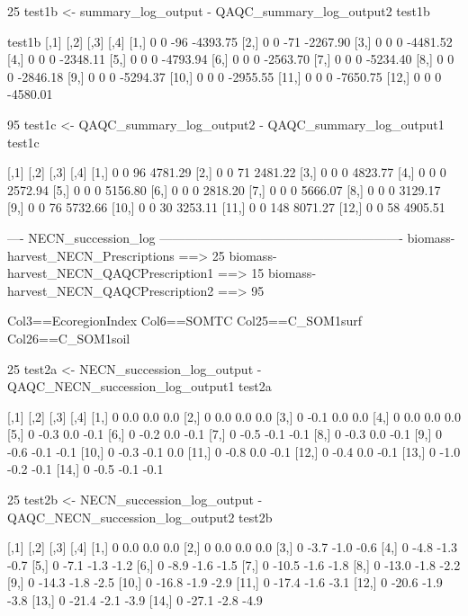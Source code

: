 25%
test1b <- summary_log_output - QAQC_summary_log_output2
test1b

test1b
      [,1] [,2] [,3]     [,4]
 [1,]    0    0  -96 -4393.75
 [2,]    0    0  -71 -2267.90
 [3,]    0    0    0 -4481.52
 [4,]    0    0    0 -2348.11
 [5,]    0    0    0 -4793.94
 [6,]    0    0    0 -2563.70
 [7,]    0    0    0 -5234.40
 [8,]    0    0    0 -2846.18
 [9,]    0    0    0 -5294.37
[10,]    0    0    0 -2955.55
[11,]    0    0    0 -7650.75
[12,]    0    0    0 -4580.01


95%
test1c <- QAQC_summary_log_output2 - QAQC_summary_log_output1
test1c

      [,1] [,2] [,3]    [,4]
 [1,]    0    0   96 4781.29
 [2,]    0    0   71 2481.22
 [3,]    0    0    0 4823.77
 [4,]    0    0    0 2572.94
 [5,]    0    0    0 5156.80
 [6,]    0    0    0 2818.20
 [7,]    0    0    0 5666.07
 [8,]    0    0    0 3129.17
 [9,]    0    0   76 5732.66
[10,]    0    0   30 3253.11
[11,]    0    0  148 8071.27
[12,]    0    0   58 4905.51


---- NECN_succession_log ----------------------------------------------------------
biomass-harvest_NECN_Prescriptions	==> 25%
biomass-harvest_NECN_QAQCPrescription1	==> 15%
biomass-harvest_NECN_QAQCPrescription2	==> 95%

Col3==EcoregionIndex
Col6==SOMTC
Col25==C_SOM1surf
Col26==C_SOM1soil

25%
test2a <- NECN_succession_log_output - QAQC_NECN_succession_log_output1
test2a

      [,1] [,2] [,3] [,4]
 [1,]    0  0.0  0.0  0.0
 [2,]    0  0.0  0.0  0.0
 [3,]    0 -0.1  0.0  0.0
 [4,]    0  0.0  0.0  0.0
 [5,]    0 -0.3  0.0 -0.1
 [6,]    0 -0.2  0.0 -0.1
 [7,]    0 -0.5 -0.1 -0.1
 [8,]    0 -0.3  0.0 -0.1
 [9,]    0 -0.6 -0.1 -0.1
[10,]    0 -0.3 -0.1  0.0
[11,]    0 -0.8  0.0 -0.1
[12,]    0 -0.4  0.0 -0.1
[13,]    0 -1.0 -0.2 -0.1
[14,]    0 -0.5 -0.1 -0.1



25%
test2b <- NECN_succession_log_output - QAQC_NECN_succession_log_output2
test2b

      [,1]  [,2] [,3] [,4]
 [1,]    0   0.0  0.0  0.0
 [2,]    0   0.0  0.0  0.0
 [3,]    0  -3.7 -1.0 -0.6
 [4,]    0  -4.8 -1.3 -0.7
 [5,]    0  -7.1 -1.3 -1.2
 [6,]    0  -8.9 -1.6 -1.5
 [7,]    0 -10.5 -1.6 -1.8
 [8,]    0 -13.0 -1.8 -2.2
 [9,]    0 -14.3 -1.8 -2.5
[10,]    0 -16.8 -1.9 -2.9
[11,]    0 -17.4 -1.6 -3.1
[12,]    0 -20.6 -1.9 -3.8
[13,]    0 -21.4 -2.1 -3.9
[14,]    0 -27.1 -2.8 -4.9


